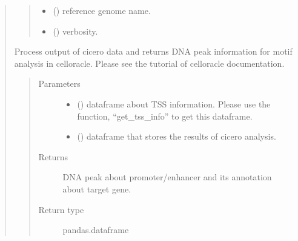 \documentclass[letterpaper,10pt,english]{sphinxmanual}
\begin{document}
\begin{quote}
\begin{fulllineitems}
\begin{quote}
\begin{description}
\begin{itemize}
\item {} 
 () \textendash{} reference genome name.

\item {} 
 () \textendash{} verbosity.

\end{itemize}

\end{description}\end{quote}

\end{fulllineitems}


\begin{fulllineitems}
\label{\detokenize{modules/celloracle.motif_analysis:celloracle.motif_analysis.integrate_tss_peak_with_cicero}}
Process output of cicero data and returns DNA peak information for motif analysis in celloracle.
Please see the tutorial of celloracle documentation.
\begin{quote}\begin{description}
\item[{Parameters}] \leavevmode\begin{itemize}
\item {} 
 () \textendash{} dataframe about TSS information. Please use the function, “get\_tss\_info” to get this dataframe.

\item {} 
 () \textendash{} dataframe that stores the results of cicero analysis.

\end{itemize}

\item[{Returns}] \leavevmode
DNA peak about promoter/enhancer and its annotation about target gene.

\item[{Return type}] \leavevmode
pandas.dataframe

\end{description}\end{quote}

\end{fulllineitems}

\end{quote}
\end{document}
